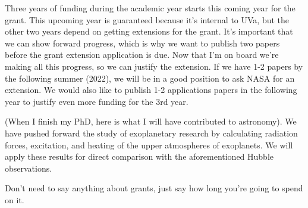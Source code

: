 \documentclass[onecolumn]{aastex63}
\begin{document}
Three years of funding during the academic year starts this coming year for the grant. This upcoming year is guaranteed because it's internal to UVa, but the other two years depend on getting extensions for the grant. It's important that we can show forward progress, which is why we want to publish two papers before the grant extension application is due. Now that I'm on board we're making all this progress, so we can justify the extension. If we have 1-2 papers by the following summer (2022), we will be in a good position to ask NASA for an extension. We would also like to publish 1-2 applications papers in the following year to justify even more funding for the 3rd year.

(When I finish my PhD, here is what I will have contributed to astronomy). We have pushed forward the study of exoplanetary research by calculating radiation forces, excitation, and heating of the upper atmospheres of exoplanets. We will apply these results for direct comparison with the aforementioned Hubble observations.

Don't need to say anything about grants, just say how long you're going to spend on it. 

{}

\end{document}
